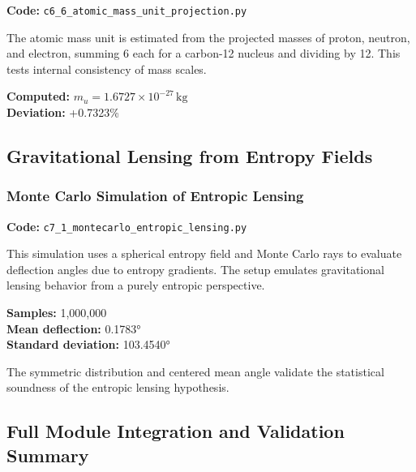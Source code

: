 \documentclass[10.5pt,a4paper]{article}
\begin{document}
\textbf{Code:} \texttt{c6\_6\_atomic\_mass\_unit\_projection.py}

The atomic mass unit is estimated from the projected masses of proton, neutron, and electron, summing 6 each for a carbon-12 nucleus and dividing by 12. This tests internal consistency of mass scales.

\textbf{Computed:} \(m_u = 1.6727 \times 10^{-27}\,\mathrm{kg}\) \\
\textbf{Deviation:} +0.7323\%

\subsection{Gravitational Lensing from Entropy Fields}

\subsubsection{Monte Carlo Simulation of Entropic Lensing}

\textbf{Code:} \texttt{c7\_1\_montecarlo\_entropic\_lensing.py}

This simulation uses a spherical entropy field and Monte Carlo rays to evaluate deflection angles due to entropy gradients. 
The setup emulates gravitational lensing behavior from a purely entropic perspective.

\textbf{Samples:} 1,000,000\\
\textbf{Mean deflection:} 0.1783°\\
\textbf{Standard deviation:} 103.4540°

The symmetric distribution and centered mean angle validate the statistical soundness of the entropic lensing hypothesis.

\subsection{Full Module Integration and Validation Summary}
\end{document}
